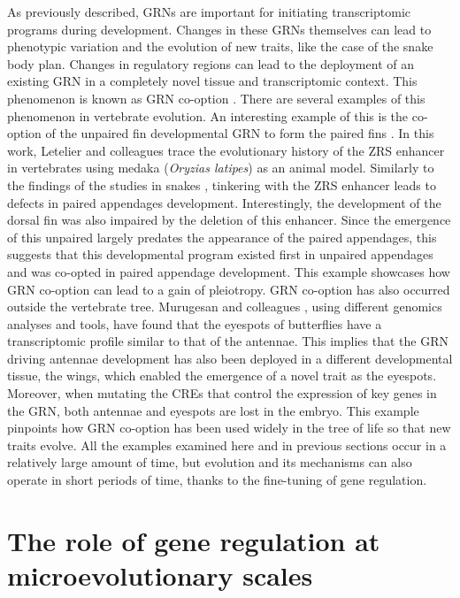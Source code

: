 As previously described, GRNs are important for initiating transcriptomic programs during development. Changes in these GRNs themselves can lead to phenotypic variation and the evolution of new traits, like the case of the snake body plan. Changes in regulatory regions can lead to the deployment of an existing GRN in a completely novel tissue and transcriptomic context. This phenomenon is known as GRN co-option \parencite{mcqueen_chapter_2020}. There are several examples of this phenomenon in vertebrate evolution. An interesting example of this is the co-option of the unpaired fin developmental GRN to form the paired fins \parencite{letelier_conserved_2018}. In this work, Letelier and colleagues trace the evolutionary history of the ZRS enhancer in vertebrates using medaka (\textit{Oryzias latipes}) as an animal model. Similarly to the findings of the studies in snakes \parencite{leal_loss_2016, kvon_progressive_2016}, tinkering with the ZRS enhancer leads to defects in paired appendages development. Interestingly, the development of the dorsal fin was also impaired by the deletion of this enhancer. Since the emergence of this unpaired largely predates the appearance of the paired appendages, this suggests that this developmental program existed first in unpaired appendages and was co-opted in paired appendage development. This example showcases how GRN co-option can lead to a gain of pleiotropy. 
GRN co-option has also occurred outside the vertebrate tree. Murugesan and colleagues \parencite{murugesan_butterfly_2022}, using different genomics analyses and tools, have found that the eyespots of butterflies have a transcriptomic profile similar to that of the antennae. This implies that the GRN driving antennae development has also been deployed in a different developmental tissue, the wings, which enabled the emergence of a novel trait as the eyespots. Moreover, when mutating the CREs that control the expression of key genes in the GRN, both antennae and eyespots are lost in the embryo. This example pinpoints how GRN co-option has been used widely in the tree of life so that new traits evolve. 
All the examples examined here and in previous sections occur in a relatively large amount of time, but evolution and its mechanisms can also operate in short periods of time, thanks to the fine-tuning of gene regulation.




\section{The role of gene regulation at microevolutionary scales}

